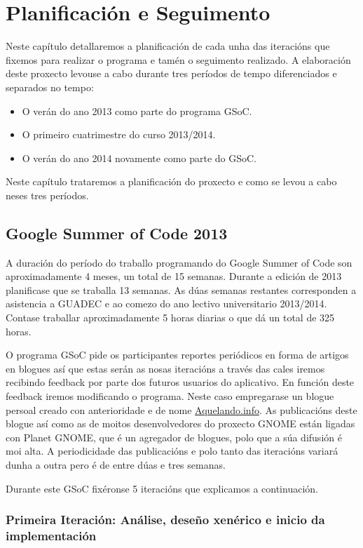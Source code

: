 \chapter{Planificación e Seguimento}

Neste capítulo detallaremos a planificación de cada unha das iteracións que fixemos para realizar o programa e tamén o seguimento realizado. A elaboración deste proxecto levouse a cabo durante tres períodos de tempo diferenciados e separados no tempo:

\begin{itemize}
  \item O verán do ano 2013 como parte do programa GSoC.
  \item O primeiro cuatrimestre do curso 2013/2014.
  \item O verán do ano 2014 novamente como parte do GSoC.
\end{itemize}

Neste capítulo trataremos a planificación do proxecto e como se levou a cabo neses tres períodos.

\section{Google Summer of Code 2013}
A duración do período do traballo programando do Google Summer of Code son aproximadamente 4 meses, un total de 15 semanas. Durante a edición de 2013 planificase que se traballa 13 semanas. As dúas semanas restantes corresponden a asistencia a GUADEC e ao comezo do ano lectivo universitario 2013/2014. Contase traballar aproximadamente 5 horas diarias o que dá un total de 325 horas.

O programa GSoC pide os participantes reportes periódicos en forma de artigos en blogues así que estas serán as nosas iteracións a través das cales iremos recibindo feedback por parte dos futuros usuarios do aplicativo. En función deste feedback iremos modificando o programa. Neste caso empregarase un blogue persoal creado con anterioridade e de nome \href{http://aquelando.info}{Aquelando.info}. As publicacións deste blogue así como as de moitos desenvolvedores do proxecto GNOME están ligadas con Planet GNOME, que é un agregador de blogues, polo que a súa difusión é moi alta. A periodicidade das publicacións e polo tanto das iteracións variará dunha a outra pero é de entre dúas e tres semanas.

Durante este GSoC fixéronse 5 iteracións que explicamos a continuación.

\subsection{Primeira Iteración: Análise, deseño xenérico e inicio da implementación}

